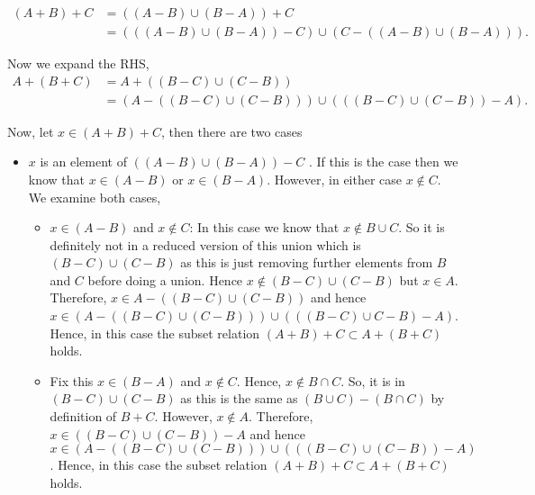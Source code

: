 \begin{solution}
  \begin{align*}
    \left(A + B  \right) + C &= \left( \left( A - B \right) \cup \left( B - A \right) \right) + C \\
    &= \left( \left( \left( A - B \right) \cup \left( B - A \right) \right) - C \right) \cup \left( C - \left( \left( A - B  \right) \cup \left( B- A \right) \right) \right)
  .\end{align*}

  Now we expand the RHS,
  \begin{align*}
    A + \left( B + C \right) &= A + \left( \left( B - C \right) \cup  \left( C - B \right) \right) \\
    &= \left( A - \left( \left( B - C \right) \cup  \left( C - B \right) \right) \right) \cup \left( \left( \left( B - C \right) \cup  \left( C - B \right) \right) - A \right)
  .\end{align*}

  Now, let \( x \in \left( A + B \right) + C \), then there are two cases 

  \begin{itemize}
   \item \( x  \) is an element of \( \left( \left( A - B \right) \cup \left( B - A \right) \right) - C \) . If this is the case then
     we know that \( x \in \left( A - B \right) \) or \( x \in  \left( B - A \right) \). However, in either case
     \( x \notin C \). We examine both cases,
     \begin{itemize}
      \item \( x \in \left( A - B \right) \) and \( x \notin C \): In this case we know that
        \( x \notin B \cup C \). So it is definitely not in a reduced version of this union which is
        \( \left( B - C \right) \cup  \left( C - B \right) \) as this is just removing further elements from
        \( B  \) and \( C \) before doing a union. Hence \( x \notin \left( B - C \right) \cup \left( C - B \right) \) but \( x \in A \). 
        Therefore, \( x \in A - \left( \left( B - C \right) \cup \left( C - B \right) \right)\) and hence 
        \( x \in  \left( A - \left( \left( B - C \right) \cup  \left( C - B \right) \right) \right) \cup \left( \left( \left( B - C \right) \cup  C - B \right) - A \right)\). Hence,
        in this case the subset relation \( \left( A + B \right) + C \subset A +  \left(   B + C\right) \) holds.

      \item Fix this \( x \in  \left( B - A \right) \) and \( x \notin C \). Hence, \( x \notin B \cap C \). So, it is in
        \( \left( B - C \right) \cup  \left( C - B \right) \) as this is the same as \( \left( B \cup C \right) - \left( B \cap C \right) \) by definition of \( B + C \). However, \( x \notin A \).
      Therefore, \( x \in  \left( \left( B - C \right) \cup \left( C - B \right)  \right)  - A \) and hence \( x \in \left( A - \left( \left( B - C \right) \cup \left( C - B \right) \right) \right) \cup \left( \left( \left( B - C \right) \cup \left( C - B \right) \right)  - A \right) \).
      Hence, in this case the subset relation \( \left( A + B \right) + C \subset A + \left( B + C \right) \) holds.


\end{itemize}
\end{itemize}
\end{solution}
